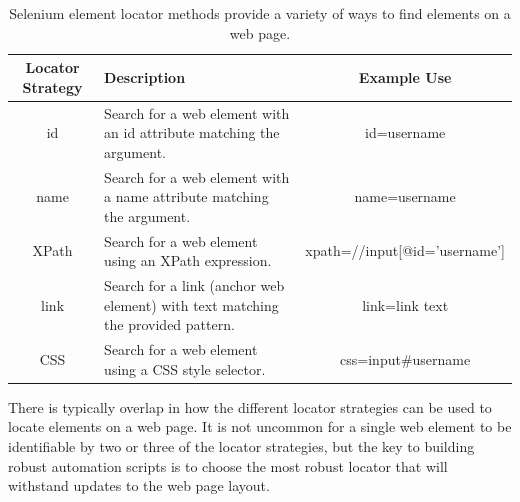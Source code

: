 \begin{table}[h]
  \centering
  \caption{Selenium element locator methods provide a variety of ways to find
elements on a web page.}
  \begin{tabular}{ | c | p{5cm} | c | }
    \hline
    Locator Strategy  & Description           & Example Use \\
    \hline
    id                & Search for a web
                        element with an id
                        attribute matching
                        the argument.         & id=username \\
    \hline
    name              & Search for a web
                        element with a
                        name attribute
                        matching the
                        argument.             & name=username \\
    \hline
    XPath             & Search for a web
                        element using
                        an XPath expression.  & xpath=//input[@id='username'] \\
    \hline
    link              & Search for a link
                        (anchor web element)
                        with text matching
                        the provided pattern. & link=link text \\
    \hline
    CSS               & Search for a web
                        element using a
                        CSS style selector.   & css=input\#username \\
    \hline
  \end{tabular}
  \label{tab:locatorMethods}
\end{table}

There is typically overlap in how the different locator strategies can be used
to locate elements on a web page. It is not uncommon for a single web element
to be identifiable by two or three of the locator strategies, but the key to
building robust automation scripts is to choose the most robust locator that
will withstand updates to the web page layout.



